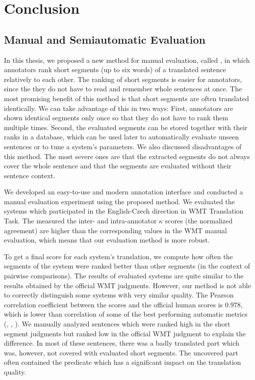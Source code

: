 \chapter{Conclusion}
\label{chapter:conclusion}

\section{Manual and Semiautomatic Evaluation}

In this thesis, we proposed a new method for manual evaluation, called
, in which annotators rank short segments (up to six words) of
a translated sentence relatively to each other. The ranking of short segments
is easier for annotators, since the they do not have to read and remember whole
sentences at once. The most promising benefit of this method is that short
segments are often translated identically.  We can take advantage of this in
two ways: First, annotators are shown identical segments only once so that they
do not have to rank them multiple times. Second, the evaluated segments can be
stored together with their ranks in a database, which can be used later to
automatically evaluate unseen sentences or to tune a system's parameters. We
also discussed disadvantages of this method. The most severe ones are that the
extracted segments do not always cover the whole sentence and that the segments
are evaluated without their sentence context.

We developed an easy-to-use and modern annotation interface and conducted a
manual evaluation experiment using the proposed method. We evaluated the
systems which participated in the English-Czech direction in WMT Translation
Task. The measured the inter- and intra-annotator $\kappa$ scores (the
normalized agreement) are higher than the corresponding values in the WMT
manual evaluation, which means that our evaluation method is more robust.

To get a final score for each system's translation, we compute how often the
segments of the system were ranked better than other segments (in the context
of pairwise comparisons).  The results of evaluated systems are quite similar
to the results obtained by the official WMT judgments. However, our method is
not able to correctly distinguish some systems with very similar quality. The
Pearson correlation coefficient between the  scores and the
official human scores is 0.978, which is lower than correlation of some of the
best performing automatic metrics (, ,
). We manually analyzed sentences which were ranked high in the
short segment judgments but ranked low in the official WMT judgment to explain
the difference. In most of these sentences, there was a badly translated part
which was, however, not covered with evaluated short segments.  The uncovered
part often contained the predicate which has a significant impact on the
translation quality. 

